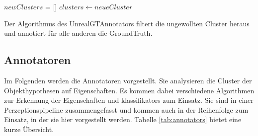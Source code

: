 \begin{algorithm}[H]
\BlankLine
$newClusters$ = []\;
$clusters \gets neueCluster$\;
\caption[UnrealGTAnnotator]{Der Algorithmus des UnrealGTAnnotators filtert die ungewollten Cluster heraus und annotiert für alle anderen die GroundTruth.}
\label{alg:UnrealGTAnnotator}
\end{algorithm}

\subsection{Annotatoren}

Im Folgenden werden die Annotatoren vorgestellt. Sie analysieren die Cluster der Objekthypothesen auf Eigenschaften. Es kommen dabei verschiedene Algorithmen zur Erkennung der Eigenschaften und \glspl{klassifikator} zum Einsatz. Sie sind in einer Perzeptionspipeline zusammengefasst und kommen auch in der Reihenfolge zum Einsatz, in der sie hier vorgestellt werden. Tabelle \ref{tab:annotators} bietet eine kurze Übersicht.

